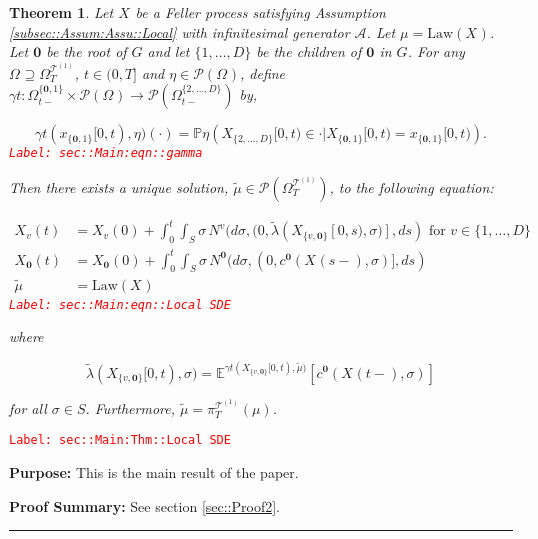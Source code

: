 \documentclass[12pt]{article}
\newcommand{\mb}{\mathbb}
\newcommand{\mc}{\mathcal}
\newcommand{\ra}{\rightarrow}
\newcommand{\te}{\text}
\newcommand{\tr}{\textcolor{red}}
\newcommand{\labe}[1]{\tr{\texttt{Label: #1}}}
\newcommand{\purpose}{\textbf{Purpose: }}
\newcommand{\pfsum}{\textbf{Proof Summary: }}
\newcommand{\lin}{\rule{\linewidth}{0.4 pt}}
\newcommand{\pr}{\mb{P}}							%
\newcommand{\exmu}[2]{\mb{E}^{#1}\left[#2\right]}	%
\newcommand{\pmsr}{\mc{P}}							%
\renewcommand{\root}{\mathbf{0}}				%
\renewcommand{\v}{v}							%
\renewcommand{\S}{S}							%
\newcommand{\s}{\sigma}							%
\newcommand{\T}{T}								%
\newcommand{\x}{x}								%
\renewcommand{\t}{t}							%
\newcommand{\sset}{\Omega}						%
\newcommand{\proj}{\pi}							%
\renewcommand{\tt}{s}							%
\newcommand{\X}{X}								%
\newcommand{\IG}{\mc{A}}						%
\newcommand{\IGr}{c}							%
\newcommand{\vind}[1]{^{#1}}					%
\newcommand{\vsi}[1]{^{#1}}						%
\newcommand{\cind}[1]{_{#1}}					%
\newcommand{\tp}[1]{(#1)}						%
\newcommand{\tip}[1]{#1}						%
\newcommand{\ts}[1]{_{#1}}						%
\newcommand{\degr}{D}							%
\newcommand{\tree}{\mc{T}}						%
\newcommand{\sln}[1]{^{(#1)}}						%
\newcommand{\poiss}{N}							%
\newcommand{\alt}[1]{\widetilde{#1}}			%
\newcommand{\m}{\mu}							%
\newcommand{\mmm}{\eta}							%
\newcommand{\cm}{\gamma}						%
\newcommand{\law}{\te{Law}}						%
\newcommand{\crate}{\alt{\lambda}}				%
\newtheorem{thms}{Theorem}[section]
\begin{document}
\begin{thms}
Let \(\X\cind{}\tip{}\) be a Feller process satisfying Assumption \ref{subsec::Assum:Assu::Local} with infinitesimal generator \(\IG\). Let \(\m{}{}{} = \law(\X\cind{}\tip{})\). Let \(\root\) be the root of \(G\) and let \(\{1,\dots,\degr\}\) be the children of \(\root\) in \(G\). For any \(\sset\vsi{}\ts{} \supseteq\sset\vsi{\tree\sln{1}}\ts{\T}\), \(\t\in (0,\T]\) and \(\mmm{}{}{} \in \pmsr(\sset\vsi{}\ts{})\), define \(\cm{\t}:\sset\vsi{\{\root,1\}}\ts{\t-}\times \pmsr(\sset\vsi{}\ts{}) \ra \pmsr(\sset\vsi{\{2,\dots,\degr\}}\ts{\t-})\) by,

\begin{equation}
\cm{\t}(\x\cind{\{\root,1\}}\tip{[0,\t)},\mmm{}{}{})(\cdot) = \pr{\mmm{}{}{}}\left(\X\cind{\{2,\dots,\degr\}}\tip{[0,\t)} \in \cdot|\X\cind{\{\root,1\}}\tip{[0,\t)} = \x\cind{\{\root,1\}}\tip{[0,\t)}\right).
\label{sec::Main:eqn::gamma}
\end{equation}
\labe{sec::Main:eqn::gamma}

Then there exists a unique solution, \(\alt{\m{}{}{}} \in \pmsr(\sset\vsi{\tree\sln{1}}\ts{\T})\), to the following equation:

\begin{align}
\X\cind{\v}\tp{\t} &= \X\cind{\v}\tp{0} + \int_0^\t\int_\S \s\,\poiss\vind{\v}(d\s,(0,\crate{}(\X\cind{\{\v,\root\}}\tip{[0,\tt)},\s)],d\tt) \te{ for } \v \in \{1,\dots,\degr\}\nonumber\\
\X\cind{\root}\tp{\t} &= \X\cind{\root}\tp{0} + \int_0^\t\int_\S \s\,\poiss\vind{\root}(d\s,(0,\IGr\vind{\root}(\X\cind{}\tp{\tt-},\s)],d\tt)\nonumber\\
\alt{\m{}{}{}} &= \law(\X\cind{}\tip{})
\label{sec::Main:eqn::Local SDE}
\end{align}
\labe{sec::Main:eqn::Local SDE}

where

\[\crate{}(\X\cind{\{\v,\root\}}\tip{[0,\t)},\s) = \exmu{\cm{\t}(\X\cind{\{\v,\root\}}\tip{[0,\t)},\alt{\m{}{}{}})}{\IGr\vind{\root}(\X\cind{}\tp{\t-},\s)}\]

for all \(\s\in \S\). Furthermore, \(\alt{\m{}{}{}} = \proj\vsi{\tree\sln{1}}\ts{\T}(\m{}{}{})\).
\label{sec::Main:Thm::Local SDE}
\end{thms}
\labe{sec::Main:Thm::Local SDE}

\purpose This is the main result of the paper. 

\pfsum See section \ref{sec::Proof2}.

\lin
\end{document}
